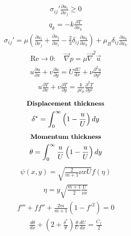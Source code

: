 \documentclass[10pt, a4paper]{article}
\begin{document}
\begin{multicols}{2}
\begin{gather*}
\end{gather*}
\begin{gather*}
    \sigma_{ij}' \frac{\partial u_i}{\partial x_j} \geq 0
\end{gather*}
\begin{gather*}
    q_k = -k\frac{\partial T}{\partial x_k}
\end{gather*}
\begin{gather*}
    \sigma_{ij}' = \mu \left( \frac{\partial u_i}{\partial x_j} + \frac{\partial u_j}{\partial x_i}
    - \frac23\delta_{ij}\frac{\partial u_k}{\partial x_k} \right) + \mu_B\delta_{ij}\frac{\partial u_k}{\partial x_k}
\end{gather*}
\begin{gather*}
    \text{Re} \rightarrow 0: \quad \vec{\nabla}p = \mu \vec{\nabla}^2 \vec{u}
\end{gather*}
\begin{gather*}
    u\frac{\partial u}{\partial x} + v \frac{\partial u}{\partial y} =
    U \frac{dU}{dx} + \nu \frac{\partial^2 u}{\partial y^2}
\end{gather*}
\begin{gather*}
    u\frac{\partial T}{\partial x} + v \frac{\partial T}{\partial y} =
    \frac{k}{\rho c_p} \frac{\partial^2 T}{\partial y^2}
\end{gather*}
\begin{gather*}
    \textbf{\small Displacement thickness} \\
    \delta^* = \int_0^\infty\left( 1 - \frac{u}{U} \right)dy
\end{gather*}
\begin{gather*}
    \textbf{\small Momentum thickness} \\
    \theta = \int_0^\infty \frac{u}{U}\left( 1 - \frac{u}{U} \right)dy
\end{gather*}
\begin{gather*}
    \psi(x,y) = \sqrt{\frac{2}{m+1}\nu x U}f(\eta)
\end{gather*}
\begin{gather*}
    \eta = y \sqrt{\frac{m+1}{2}\frac{U}{\nu x}}
\end{gather*}
\begin{gather*}
    f''' + ff'' + \frac{2m}{m+1}(1-f'^2)=0
\end{gather*}
\begin{gather*}
    \frac{d\theta}{dx} + \left( 2 + \frac{\delta^*}{\theta} \right)\frac{\theta}{U}\frac{dU}{dx} =
    \frac{C_f}{2}
\end{gather*}
\end{multicols}
\end{document}
